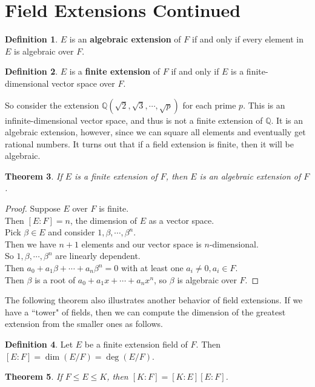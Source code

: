 \documentclass[11pt]{amsart}
\newtheorem{theorem}{Theorem}[section]
\theoremstyle{definition}
\newtheorem{definition}[theorem]{Definition}
\newcommand{\rationals}{\mathbb{Q}}
\begin{document}
\section{Field Extensions Continued}
\begin{definition}
	$E$ is an \textbf{algebraic extension} of $F$ if and only if every element in $E$ is algebraic over $F$.
\end{definition}
\begin{definition}
	$E$ is a \textbf{finite extension} of $F$ if and only if $E$ is a finite-dimensional vector space over $F$.
\end{definition}
So consider the extension $\rationals(\sqrt{2}, \sqrt{3}, \cdots, \sqrt{p})$ for each prime $p$. This is an infinite-dimensional vector space, and
thus is not a finite extension of $\rationals$. It is an algebraic extension, however, since we can square all elements and eventually get rational
numbers. It turns out that if a field extension is finite, then it will be algebraic.
\begin{theorem}
	If $E$ is a finite extension of $F$, then $E$ is an algebraic extension of $F$.
\end{theorem}
\begin{proof}
	Suppose $E$ over $F$ is finite. \\
	Then $[ E : F ] = n$, the dimension of $E$ as a vector space. \\
	Pick $\beta \in E$ and consider $1, \beta, \cdots, \beta^n$. \\
	Then we have $n+1$ elements and our vector space is $n$-dimensional. \\
	So $1, \beta, \cdots, \beta^n$ are linearly dependent. \\
	Then $a_0 + a_1\beta + \cdots + a_n \beta^n = 0$ with at least one $a_i \neq 0, a_i \in F$. \\
	Then $\beta$ is a root of $a_0 + a_1 x + \cdots + a_n x^n$, so $\beta$ is algebraic over $F$.
\end{proof}
The following theorem also illustrates another behavior of field extensions. If we have a ``tower" of fields, then we can compute the dimension
of the greatest extension from the smaller ones as follows.
\begin{definition}
	Let $E$ be a finite extension field of $F$. Then $[ E : F ] = \dim(E/F) = \deg(E/F)$.
\end{definition}
\begin{theorem}
	If $F \leq E \leq K$, then $[ K : F ] = [ K : E ][E : F]$.
\end{theorem}
\end{document}
